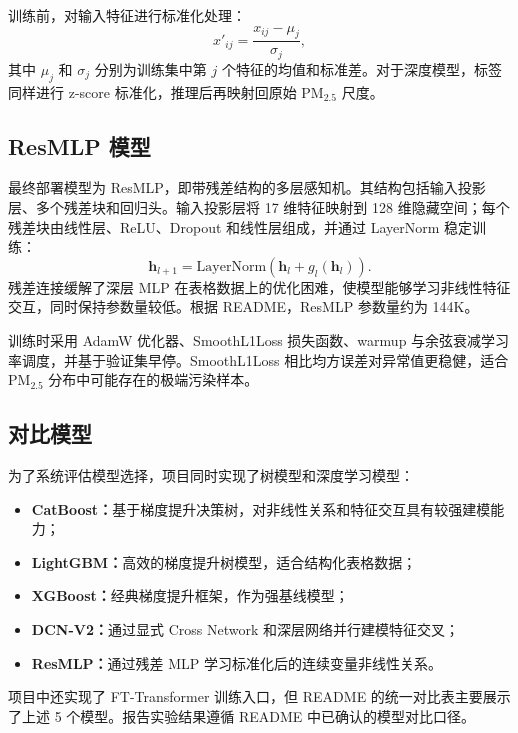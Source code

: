 \documentclass[UTF8,zihao=-4,a4paper]{ctexart}
\newcommand{\pmfine}{PM$_{2.5}$}
\begin{document}
训练前，对输入特征进行标准化处理：
\begin{equation}
  x'_{ij} = \frac{x_{ij}-\mu_j}{\sigma_j},
  \label{eq:standardize}
\end{equation}
其中 $\mu_j$ 和 $\sigma_j$ 分别为训练集中第 $j$ 个特征的均值和标准差。对于深度模型，标签同样进行 z-score 标准化，推理后再映射回原始 \pmfine{} 尺度。

\subsection{ResMLP 模型}

最终部署模型为 ResMLP，即带残差结构的多层感知机。其结构包括输入投影层、多个残差块和回归头。输入投影层将 17 维特征映射到 128 维隐藏空间；每个残差块由线性层、ReLU、Dropout 和线性层组成，并通过 LayerNorm 稳定训练：
\begin{equation}
  \mathbf{h}_{l+1} = \mathrm{LayerNorm}\left(\mathbf{h}_{l} + g_l(\mathbf{h}_{l})\right).
  \label{eq:resblock}
\end{equation}
残差连接缓解了深层 MLP 在表格数据上的优化困难，使模型能够学习非线性特征交互，同时保持参数量较低。根据 README，ResMLP 参数量约为 144K。

训练时采用 AdamW 优化器、SmoothL1Loss 损失函数、warmup 与余弦衰减学习率调度，并基于验证集早停。SmoothL1Loss 相比均方误差对异常值更稳健，适合 \pmfine{} 分布中可能存在的极端污染样本。

\subsection{对比模型}

为了系统评估模型选择，项目同时实现了树模型和深度学习模型：
\begin{itemize}
  \item \textbf{CatBoost：}基于梯度提升决策树，对非线性关系和特征交互具有较强建模能力；
  \item \textbf{LightGBM：}高效的梯度提升树模型，适合结构化表格数据；
  \item \textbf{XGBoost：}经典梯度提升框架，作为强基线模型；
  \item \textbf{DCN-V2：}通过显式 Cross Network 和深层网络并行建模特征交叉；
  \item \textbf{ResMLP：}通过残差 MLP 学习标准化后的连续变量非线性关系。
\end{itemize}

项目中还实现了 FT-Transformer 训练入口，但 README 的统一对比表主要展示了上述 5 个模型。报告实验结果遵循 README 中已确认的模型对比口径。
\end{document}
